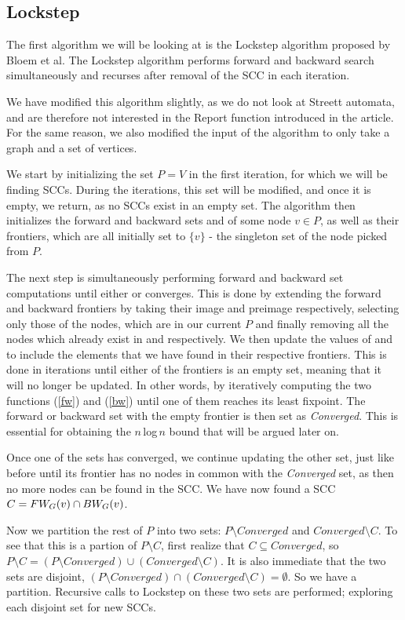 \documentclass[../master/master.tex]{subfiles}
\begin{document}
\subsection{Lockstep}
The first algorithm we will be looking at is the Lockstep algorithm proposed by Bloem et al. \cite{lockstep} The Lockstep algorithm performs forward and backward search simultaneously and recurses after removal of the SCC in each iteration.

We have modified this algorithm slightly, as we do not look at Streett automata, and are therefore not interested in the Report function introduced in the article. For the same reason, we also modified the input of the algorithm to only take a graph and a set of vertices. 

We start by initializing the set $P=V$ in the first iteration, for which we will be finding SCCs. During the iterations, this set will be modified, and once it is empty, we return, as no SCCs exist in an empty set. The algorithm then initializes the forward and backward sets  and  of some node $v\in P$, as well as their frontiers, which are all initially set to $\{v\}$ - the singleton set of the node picked from $P$.

The next step is simultaneously performing forward and backward set computations until either  or  converges. This is done by extending the forward and backward frontiers by taking their image and preimage respectively, selecting only those of the nodes, which are in our current $P$ and finally removing all the nodes which already exist in  and  respectively. We then update the values of  and  to include the elements that we have found in their respective frontiers. This is done in iterations until either of the frontiers is an empty set, meaning that it will no longer be updated.
In other words, by iteratively computing the two functions (\ref{fw}) and (\ref{bw}) until one of them reaches its least fixpoint. The forward or backward set with the empty frontier is then set as \emph{Converged}. This is essential for obtaining the $n$\,log\,$n$ bound that will be argued later on.

Once one of the sets has converged, we continue updating the other set, just like before until its frontier has no nodes in common with the \emph{Converged} set, as then no more nodes can be found in the SCC.
We have now found a SCC $C=FW_{G}(v)\cap BW_{G}(v)$. 

Now we partition the rest of $P$ into two sets: $P\setminus Converged$ and $Converged\setminus C$. To see that this is a partion of $P\setminus C$, first realize that $C\subseteq Converged$, so $P\setminus C = (P\setminus Converged) \cup (Converged\setminus C)$. It is also immediate that the two sets are disjoint, $(P\setminus Converged)\cap (Converged\setminus C)=\emptyset$. So we have a partition. Recursive calls to Lockstep on these two sets are performed; exploring each disjoint set for new SCCs. 
\end{document}

